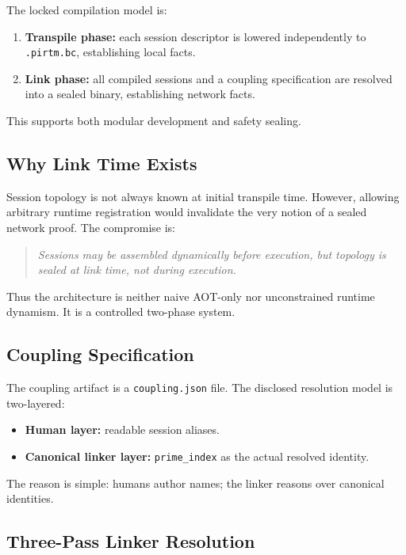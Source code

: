 \documentclass[11pt]{article}
\begin{document}
The locked compilation model is:

\begin{enumerate}[leftmargin=2em]
  \item \textbf{Transpile phase:} each session descriptor is lowered independently to \texttt{.pirtm.bc}, establishing local facts.
  \item \textbf{Link phase:} all compiled sessions and a coupling specification are resolved into a sealed binary, establishing network facts.
\end{enumerate}

This supports both modular development and safety sealing.

\subsection{Why Link Time Exists}

Session topology is not always known at initial transpile time. However, allowing arbitrary runtime registration would invalidate the very notion of a sealed network proof. The compromise is:
\begin{quote}
\emph{Sessions may be assembled dynamically before execution, but topology is sealed at link time, not during execution.}
\end{quote}

Thus the architecture is neither naive AOT-only nor unconstrained runtime dynamism. It is a controlled two-phase system.

\subsection{Coupling Specification}

The coupling artifact is a \texttt{coupling.json} file. The disclosed resolution model is two-layered:

\begin{itemize}[leftmargin=2em]
  \item \textbf{Human layer:} readable session aliases.
  \item \textbf{Canonical linker layer:} \texttt{prime\_index} as the actual resolved identity.
\end{itemize}

The reason is simple: humans author names; the linker reasons over canonical identities.

\subsection{Three-Pass Linker Resolution}
\end{document}
